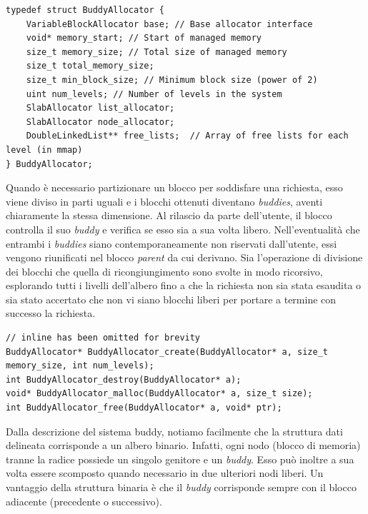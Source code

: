 \begin{lstlisting}
typedef struct BuddyAllocator {
    VariableBlockAllocator base; // Base allocator interface
    void* memory_start; // Start of managed memory
    size_t memory_size; // Total size of managed memory
    size_t total_memory_size;
    size_t min_block_size; // Minimum block size (power of 2)
    uint num_levels; // Number of levels in the system
    SlabAllocator list_allocator;
    SlabAllocator node_allocator;
    DoubleLinkedList** free_lists;  // Array of free lists for each level (in mmap)
} BuddyAllocator;
\end{lstlisting}

Quando è necessario partizionare un blocco per soddisfare una richiesta, esso viene diviso in parti uguali e i blocchi ottenuti diventano \textit{buddies}, aventi chiaramente la stessa dimensione. Al rilascio da parte dell’utente, il blocco controlla il suo \textit{buddy} e verifica se esso sia a sua volta libero.
Nell’eventualità che entrambi i \textit{buddies} siano contemporaneamente non riservati dall’utente, essi vengono riunificati nel blocco \textit{parent} da cui derivano. Sia l'operazione di divisione dei blocchi che quella di ricongiungimento sono svolte in modo ricorsivo, esplorando tutti i livelli dell'albero fino a che la richiesta non sia stata esaudita o sia stato accertato che non vi siano blocchi liberi per portare a termine con successo la richiesta. 

\begin{lstlisting}
// inline has been omitted for brevity
BuddyAllocator* BuddyAllocator_create(BuddyAllocator* a, size_t memory_size, int num_levels);
int BuddyAllocator_destroy(BuddyAllocator* a);
void* BuddyAllocator_malloc(BuddyAllocator* a, size_t size);
int BuddyAllocator_free(BuddyAllocator* a, void* ptr);
\end{lstlisting}

Dalla descrizione del sistema buddy, notiamo facilmente che la struttura dati delineata corrisponde a un albero binario. Infatti, ogni nodo (blocco di memoria) tranne la radice possiede un singolo genitore e un \textit{buddy}. Esso può inoltre a sua volta essere scomposto quando necessario in due ulteriori nodi liberi. Un vantaggio della struttura binaria è che il \textit{buddy} corrisponde sempre con il blocco adiacente (precedente o successivo).

